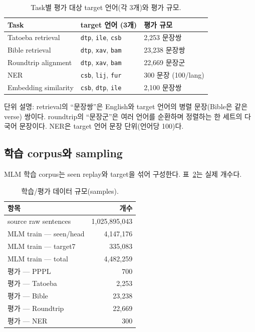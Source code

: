 \documentclass[11pt,a4paper]{article}
\begin{document}
\begin{table}[H]\centering\small
\caption{Task별 평가 대상 target 언어(각 3개)와 평가 규모.}
\label{tab:taskcov}
\begin{tabular}{@{}lll@{}}
\toprule
Task & target 언어 (3개) & 평가 규모 \\
\midrule
Tatoeba retrieval & \texttt{dtp}, \texttt{ile}, \texttt{csb} & 2{,}253 문장쌍 \\
Bible retrieval & \texttt{dtp}, \texttt{xav}, \texttt{bam} & 23{,}238 문장쌍 \\
Roundtrip alignment & \texttt{dtp}, \texttt{xav}, \texttt{bam} & 22{,}669 문장군 \\
NER & \texttt{csb}, \texttt{lij}, \texttt{fur} & 300 문장 (100/lang) \\
Embedding similarity & \texttt{csb}, \texttt{dtp}, \texttt{ile} & 2{,}100 문장쌍 \\
\bottomrule
\end{tabular}

\vspace{2pt}
{\footnotesize 단위 설명: retrieval의 ``문장쌍''은 English와 target 언어의 병렬 문장(Bible은 같은 verse) 쌍이다. roundtrip의 ``문장군''은 여러 언어를 순환하며 정렬하는 한 세트의 다국어 문장이다. NER은 target 언어 문장 단위(언어당 100)다.}
\end{table}

\subsection{학습 corpus와 sampling}
MLM 학습 corpus는 seen replay와 target을 섞어 구성한다. 표~\ref{tab:corpus}는 실제 개수다.

\begin{table}[H]\centering\small
\caption{학습/평가 데이터 규모(samples).}
\label{tab:corpus}
\begin{tabular}{@{}lr@{}}
\toprule
항목 & 개수 \\
\midrule
source raw sentences & 1{,}025{,}895{,}043 \\
MLM train --- seen/head & 4{,}147{,}176 \\
MLM train --- target7 & 335{,}083 \\
MLM train --- total & 4{,}482{,}259 \\
\midrule
평가 --- PPPL & 700 \\
평가 --- Tatoeba & 2{,}253 \\
평가 --- Bible & 23{,}238 \\
평가 --- Roundtrip & 22{,}669 \\
평가 --- NER & 300 \\
\bottomrule
\end{tabular}
\end{table}
\end{document}
